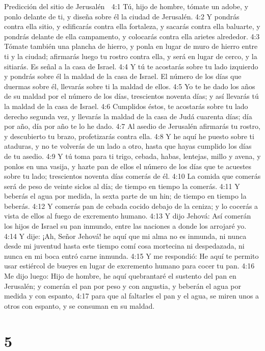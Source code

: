 Predicción del sitio de Jerusalén  

4:1 Tú, hijo de hombre, tómate un adobe, y ponlo delante de ti, y diseña sobre él la ciudad de Jerusalén.  
4:2 Y pondrás contra ella sitio, y edificarás contra ella fortaleza, y sacarás contra ella baluarte, y pondrás delante de ella campamento, y colocarás contra ella arietes alrededor.  
4:3 Tómate también una plancha de hierro, y ponla en lugar de muro de hierro entre ti y la ciudad; afirmarás luego tu rostro contra ella, y será en lugar de cerco, y la sitiarás. Es señal a la casa de Israel.  
4:4 Y tú te acostarás sobre tu lado izquierdo y pondrás sobre él la maldad de la casa de Israel. El número de los días que duermas sobre él, llevarás sobre ti la maldad de ellos.  
4:5 Yo te he dado los años de su maldad por el número de los días, trescientos noventa días; y así llevarás tú la maldad de la casa de Israel.  
4:6 Cumplidos éstos, te acostarás sobre tu lado derecho segunda vez, y llevarás la maldad de la casa de Judá cuarenta días; día por año, día por año te lo he dado.  
4:7 Al asedio de Jerusalén afirmarás tu rostro, y descubierto tu brazo, profetizarás contra ella.  
4:8 Y he aquí he puesto sobre ti ataduras, y no te volverás de un lado a otro, hasta que hayas cumplido los días de tu asedio.  
4:9 Y tú toma para ti trigo, cebada, habas, lentejas, millo y avena, y ponlos en una vasija, y hazte pan de ellos el número de los días que te acuestes sobre tu lado; trescientos noventa días comerás de él.  
4:10 La comida que comerás será de peso de veinte siclos   al día; de tiempo en tiempo la comerás.  
4:11 Y beberás el agua por medida, la sexta parte de un hin;  de tiempo en tiempo la beberás.  
4:12 Y comerás pan de cebada cocido debajo de la ceniza; y lo cocerás a vista de ellos al fuego de excremento humano.  
4:13 Y dijo Jehová: Así comerán los hijos de Israel su pan inmundo, entre las naciones a donde los arrojaré yo.  
4:14 Y dije: ¡Ah, Señor Jehová! he aquí que mi alma no es inmunda, ni nunca desde mi juventud hasta este tiempo comí cosa mortecina ni despedazada, ni nunca en mi boca entró carne inmunda.  
4:15 Y me respondió: He aquí te permito usar estiércol de bueyes en lugar de excremento humano para cocer tu pan.  
4:16 Me dijo luego: Hijo de hombre, he aquí quebrantaré el sustento del pan en Jerusalén; y comerán el pan por peso y con angustia, y beberán el agua por medida y con espanto,  
4:17 para que al faltarles el pan y el agua, se miren unos a otros con espanto, y se consuman en su maldad.  

\chapter{5}

